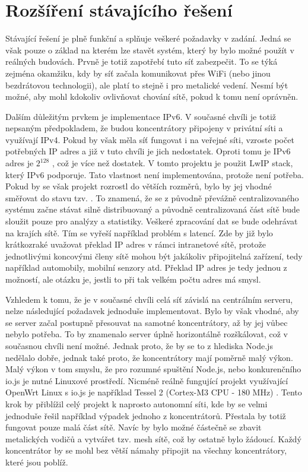 \chapter{Rozšíření stávajícího řešení}
Stávající řešení je plně funkční a splňuje veškeré požadavky v zadání. Jedná se však pouze o základ na kterém lze stavět systém, který by bylo možné použít v reálných budovách. Prvně je totiž zapotřebí tuto síť zabezpečit. To se týká zejména okamžiku, kdy by síť začala komunikovat přes WiFi (nebo jinou bezdrátovou technologii), ale platí to stejně i pro metalické vedení. Nesmí být možné, aby mohl kdokoliv ovlivňovat chování sítě, pokud k tomu není oprávněn.

Dalším důležitým prvkem je implementace IPv6. V současné chvíli je totiž nepsaným předpokladem, že budou koncentrátory připojeny v privátní síti a využívají IPv4. Pokud by však měla síť fungovat i na veřejné síti, vzroste počet potřebných IP adres a již v tuto chvíli je jich nedostatek. Oproti tomu je IPv6 adres je $2^{128}$ \cite{ripe}, což je více než dostatek. V tomto projektu je použit LwIP stack, který IPv6 podporuje. Tato vlastnost není implementována, protože není potřeba. Pokud by se však projekt rozrostl do větších rozměrů, bylo by jej vhodné směřovat do stavu tzv. . To znamená, že se z původně převážně centralizovaného systému začne stávat silně distribuovaný a původně centralizovaná část sítě bude sloužit pouze pro analýzy a statistiky. Veškeré zpracování dat se bude odehrávat na krajích sítě. Tím se vyřeší například problém s latencí. Zde by již bylo krátkozraké uvažovat překlad IP adres v rámci intranetové sítě, protože jednotlivými koncovými členy sítě mohou být jakákoliv připojitelná zařízení, tedy například automobily, mobilní senzory atd. Překlad IP adres je tedy jednou z možností, ale otázku je, jestli to při tak velkém počtu adres má smysl.

Vzhledem k tomu, že je v současné chvíli celá síť závislá na centrálním serveru, nelze následující požadavek jednoduše implementovat. Bylo by však vhodné, aby se server začal postupně přesouvat na samotné koncentrátory, až by jej vůbec nebylo potřeba. To by znamenalo server úplně horizontálně rozškálovat, což v současnou chvíli není možné. Jednak proto, že by se to z hlediska Node.js nedělalo dobře, jednak také proto, že koncentrátory mají poměrně malý výkon. Malý výkon v tom smyslu, že pro rozumné spuštění Node.js, nebo konkurenčního io.js je nutné Linuxové prostředí. Nicméně reálně fungující projekt využívající OpenWrt Linux \cite{openwrt} s io.js je například Tessel 2 (Cortex\texttrademark-M3 CPU - 180 MHz) \cite{tessel}. Tento krok by přiblížil celý projekt k naprosto autonomní síti, kde by se velmi jednoduše řešil například výpadek jednoho z koncentrátorů. Přestala by totiž fungovat pouze malá část sítě. Navíc by bylo možné částečně se zbavit metalických vodičů a vytvářet tzv. mesh sítě, což by ostatně bylo žádoucí. Každý koncentrátor by se mohl bez větší námahy připojit na všechny koncentrátory, které jsou poblíž.

